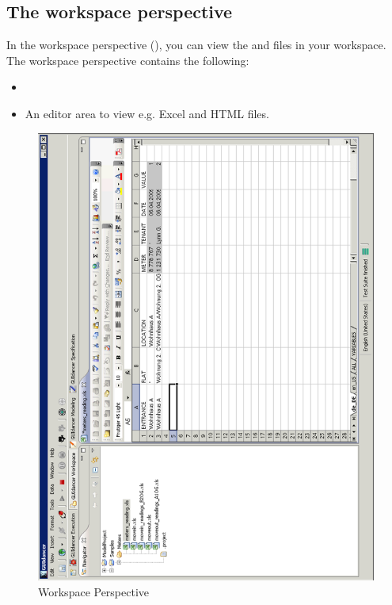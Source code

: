 \subsection{The \app{} workspace perspective}


In the workspace perspective (), you can view the \gdprojects{} and files in your workspace. The workspace perspective contains the following:


\begin{itemize}
\item \gdnavview{} 
\item An editor area to view e.g. Excel and HTML files.
\end{itemize}

\begin{figure}
\includegraphics{Userinterface/Editors/PS/workspaceperspective}
\caption{\app{} Workspace Perspective}
\label{workspaceperspective}
\end{figure}
\clearpage


